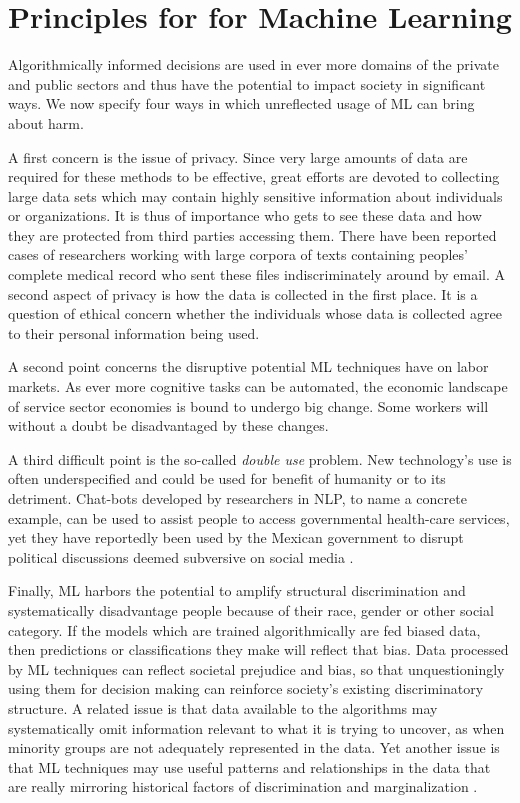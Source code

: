 \documentclass{article}
\begin{document}
\section{Principles for  for Machine Learning}\hypertarget{sec3}{}
Algorithmically informed decisions are used in ever more domains of the private and public sectors and thus have the potential to impact society in significant ways. We now specify four ways in which unreflected usage of ML can bring about harm.

A first concern is the issue of privacy. Since very large amounts of data are required for these methods to be effective, great efforts are devoted to collecting large data sets which may contain highly sensitive information about individuals or organizations. It is thus of importance who gets to see these data and how they are protected from third parties accessing them. There have been reported cases of researchers working with large corpora of texts containing peoples' complete medical record who sent these files indiscriminately around by email. A second aspect of privacy is how the data is collected in the first place. It is a question of ethical concern whether the individuals whose data is collected agree to their personal information being used.

A second point concerns the disruptive potential ML techniques have on labor markets. As ever more cognitive tasks can be automated, the economic landscape of service sector economies is bound to undergo big change. Some workers will without a doubt be disadvantaged by these changes. 

A third difficult point is the so-called \emph{double use} problem. New technology's use is often underspecified and could be used for benefit of humanity or to its detriment. Chat-bots developed by researchers in NLP, to name a concrete example, can be used to assist people to access governmental health-care services, yet they have reportedly been used by the Mexican government to disrupt political discussions deemed subversive on social media \cite{leidner2017ethical}.

Finally, ML harbors the potential to amplify structural discrimination and systematically disadvantage people because of their race, gender or other social category. If the models which are trained algorithmically are fed biased data, then predictions or classifications they make will reflect that bias.
Data processed by ML techniques can reflect societal prejudice and bias, so that unquestioningly using them for decision making can reinforce society's existing discriminatory structure. A related issue is that data available to the algorithms may systematically omit information relevant to what it is trying to uncover, as when minority groups are not adequately represented in the data. Yet another issue is that ML techniques may use useful patterns and relationships in the data that are really mirroring historical factors of discrimination and marginalization \cite{barocas2016big}.
\end{document}
